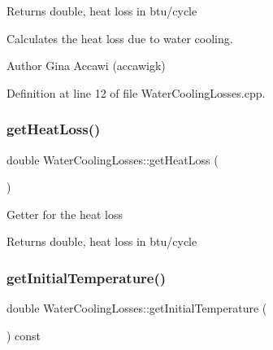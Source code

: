 \begin{DoxyReturn}{Returns}
double, heat loss in btu/cycle
\end{DoxyReturn}
Calculates the heat loss due to water cooling. \begin{DoxyAuthor}{Author}
Gina Accawi (accawigk) 
\end{DoxyAuthor}


Definition at line 12 of file Water\+Cooling\+Losses.\+cpp.

\mbox{\label{class_water_cooling_losses_a8f884cc70d7af7add5bb1be7f837384c}} 
\subsubsection{\texorpdfstring{get\+Heat\+Loss()}{getHeatLoss()}\hspace{0.1cm}{\footnotesize\ttfamily [3/3]}}
{\footnotesize\ttfamily double Water\+Cooling\+Losses\+::get\+Heat\+Loss (\begin{DoxyParamCaption}{ }\end{DoxyParamCaption})}

Getter for the heat loss

\begin{DoxyReturn}{Returns}
double, heat loss in btu/cycle 
\end{DoxyReturn}
\mbox{\label{class_water_cooling_losses_a205b469029ec9cd4d792169bf8589f24}} 
\subsubsection{\texorpdfstring{get\+Initial\+Temperature()}{getInitialTemperature()}\hspace{0.1cm}{\footnotesize\ttfamily [1/3]}}
{\footnotesize\ttfamily double Water\+Cooling\+Losses\+::get\+Initial\+Temperature (\begin{DoxyParamCaption}{ }\end{DoxyParamCaption}) const\hspace{0.3cm}{\ttfamily [inline]}}

